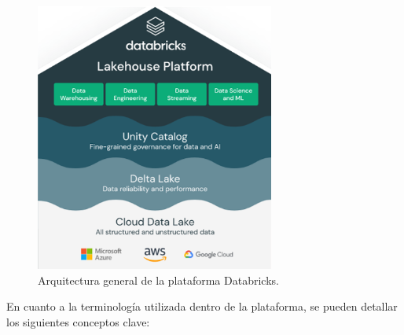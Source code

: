 \vspace{1cm}
\begin{figure}[htbp]
	\centering
	\includegraphics[width=0.7\textwidth]{./Figures/databricks.png}
	\caption{Arquitectura general de la plataforma Databricks.}
	\label{fig:databricks}
\end{figure}
\vspace{1cm}


En cuanto a la terminología utilizada dentro de la plataforma, se pueden detallar los siguientes conceptos clave:


